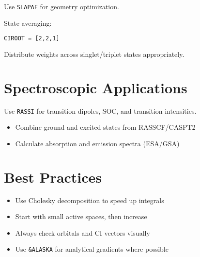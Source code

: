 Use \texttt{SLAPAF} for geometry optimization.

State averaging:

\begin{verbatim}
CIROOT = [2,2,1]
\end{verbatim}

Distribute weights across singlet/triplet states appropriately.

\section{Spectroscopic Applications}

Use \texttt{RASSI} for transition dipoles, SOC, and transition intensities.

\begin{itemize}
  \item Combine ground and excited states from RASSCF/CASPT2
  \item Calculate absorption and emission spectra (ESA/GSA)
\end{itemize}

\section{Best Practices}

\begin{itemize}
  \item Use Cholesky decomposition to speed up integrals
  \item Start with small active spaces, then increase
  \item Always check orbitals and CI vectors visually
  \item Use \texttt{&ALASKA} for analytical gradients where possible
\end{itemize}
